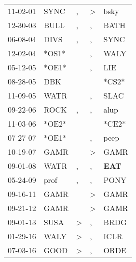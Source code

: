 \begin{supertabular}{p{0.07\textwidth}p{0.06\textwidth}p{0.02\textwidth}p{0.02\textwidth}p{0.06\textwidth}}
 11-02-01\textsuperscript{} &  SYNC\textsuperscript{} &             , &  \textgreater &          bsky\textsuperscript{} \\
 12-30-03\textsuperscript{} &  BULL\textsuperscript{} &             , &             , &          BATH\textsuperscript{} \\
 06-08-04\textsuperscript{} &  DIVS\textsuperscript{} &             , &             , &          SYNC\textsuperscript{} \\
 12-02-04\textsuperscript{} &                   *OS1* &               &             , &          WALY\textsuperscript{} \\
 05-12-05\textsuperscript{} &                   *OE1* &               &             , &           LIE\textsuperscript{} \\
 08-28-05\textsuperscript{} &   DBK\textsuperscript{} &               &               &                           *CS2* \\
 11-09-05\textsuperscript{} &  WATR\textsuperscript{} &               &             , &          SLAC\textsuperscript{} \\
 09-22-06\textsuperscript{} &  ROCK\textsuperscript{} &             , &             , &          alup\textsuperscript{} \\
 11-03-06\textsuperscript{} &                   *OE2* &               &               &                           *CE2* \\
 07-27-07\textsuperscript{} &                   *OE1* &               &             , &          peep\textsuperscript{} \\
 10-19-07\textsuperscript{} &  GAMR\textsuperscript{} &               &  \textgreater &          GAMR\textsuperscript{} \\
 09-01-08\textsuperscript{} &  WATR\textsuperscript{} &             , &             , &  \textbf{EAT\textsuperscript{}} \\
 05-24-09\textsuperscript{} &  prof\textsuperscript{} &             , &             , &          PONY\textsuperscript{} \\
 09-16-11\textsuperscript{} &  GAMR\textsuperscript{} &               &  \textgreater &          GAMR\textsuperscript{} \\
 09-21-12\textsuperscript{} &  GAMR\textsuperscript{} &               &  \textgreater &          GAMR\textsuperscript{} \\
 09-01-13\textsuperscript{} &  SUSA\textsuperscript{} &  \textgreater &             , &          BRDG\textsuperscript{} \\
 01-29-16\textsuperscript{} &  WALY\textsuperscript{} &  \textgreater &             , &          ICLR\textsuperscript{} \\
 07-03-16\textsuperscript{} &  GOOD\textsuperscript{} &  \textgreater &             , &          ORDE\textsuperscript{} \\
\end{supertabular}
